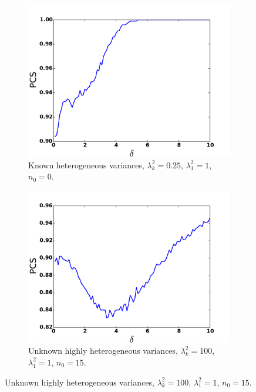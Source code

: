 \documentclass{wscpaperproc}
\theoremstyle{wsc}
\begin{document}
\begin{figure}[h]
  \centering
   \begin{subfigure}[b]{0.3\textwidth}
      \centering
       \includegraphics[width=\textwidth]{plot5.pdf}
    \caption{Known heterogeneous variances, 
        $\lambda^2_k = 0.25$, $\lambda_{1}^2 = 1$, $n_0=0$.
    \label{fig: tahi3}}
   \end{subfigure}
    \hfill
    \begin{subfigure}[b]{0.3\textwidth}
        \centering
         \includegraphics[width=\textwidth]{unknown.pdf}
             \caption{
    Unknown highly heterogeneous variances, 
    $\lambda^2_{k} = 100$, $\lambda_{1}^2 = 1$, $n_0=15$.
    \label{fig: tahi2}}
    \end{subfigure}

\end{figure}
\end{document}
